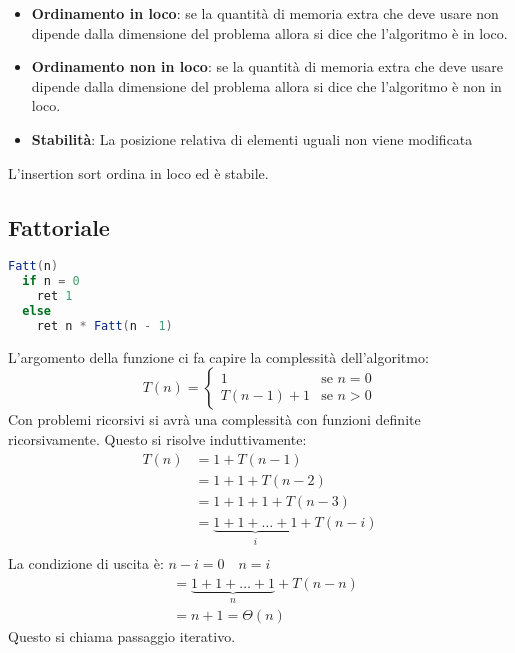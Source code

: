 \documentclass[a4paper]{article}
\begin{document}
\begin{itemize}
  \item \textbf{Ordinamento in loco}: se la quantità di memoria extra che deve usare 
    non dipende dalla dimensione del problema allora si dice che l'algoritmo è in loco.

  \item \textbf{Ordinamento non in loco}: se la quantità di memoria extra che deve usare
    dipende dalla dimensione del problema allora si dice che l'algoritmo è non in loco.

  \item \textbf{Stabilità}: La posizione relativa di elementi uguali non viene modificata
\end{itemize}
L'insertion sort ordina in loco ed è stabile.

\subsection{Fattoriale}
\begin{lstlisting}[language=Scala]
Fatt(n)
  if n = 0
    ret 1
  else 
    ret n * Fatt(n - 1)
\end{lstlisting}
L'argomento della funzione ci fa capire la complessità dell'algoritmo:
\[
  T(n) = \begin{cases}
    1 & \text{se } n = 0 \\
    T(n - 1) + 1 & \text{se } n > 0
  \end{cases}
\] 
Con problemi ricorsivi si avrà una complessità con funzioni definite ricorsivamente.
Questo si risolve induttivamente:
\[
  \begin{aligned}
    T(n) & = 1 + T(n-1)\\
         & = 1 + 1 + T(n-2)\\
         & = 1 + 1 + 1 + T(n-3)\\
         & = \underbrace{1 + 1 + \ldots + 1}_{i} + T(n-i)\\
  \end{aligned}
\] 
La condizione di uscita è: \( n-i = 0 \quad n = i \) 
\[
\begin{aligned}
         & = \underbrace{1 + 1 + \ldots + 1}_{n} + T(n-n)\\
         & = n + 1 = \Theta(n)
\end{aligned}
\] 
Questo si chiama passaggio iterativo.
\end{document}
